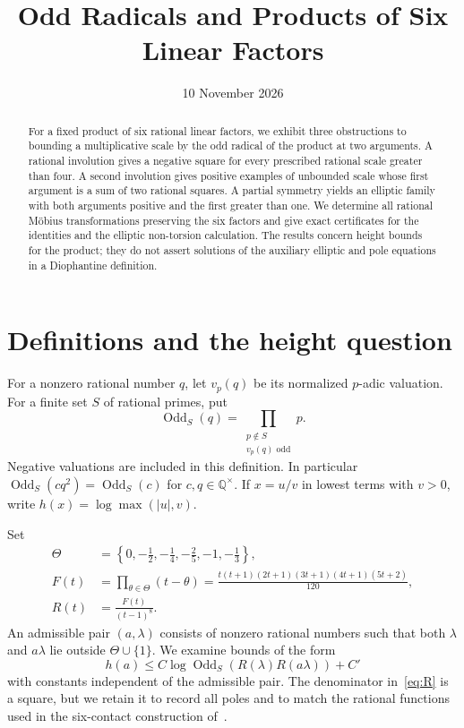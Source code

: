 \documentclass[11pt,a4paper]{article}
\title{Odd Radicals and Products of Six Linear Factors}
\author{}\date{10 November 2026}
\newcommand{\Q}{\mathbb Q}\newcommand{\Z}{\mathbb Z}
\DeclareMathOperator{\Odd}{Odd}
\begin{document}
\maketitle
\begin{abstract}
For a fixed product of six rational linear factors, we exhibit three
obstructions to bounding a multiplicative scale by the odd radical of
the product at two arguments. A rational involution gives a negative
square for every prescribed rational scale greater than four. A second
involution gives positive examples of unbounded scale whose first
argument is a sum of two rational squares. A partial symmetry yields
an elliptic family with both arguments positive and the first greater
than one. We determine all rational M\"obius transformations preserving
the six factors and give exact certificates for the identities and
the elliptic non-torsion calculation. The results concern height bounds
for the product; they do not assert solutions of the auxiliary elliptic
and pole equations in a Diophantine definition.
\end{abstract}

\section{Definitions and the height question}

For a nonzero rational number $q$, let $v_p(q)$ be its normalized
$p$-adic valuation. For a finite set $S$ of rational primes, put
\[
 \Odd_S(q)=\prod_{\substack{p\notin S\\v_p(q)\text{ odd}}}p.
\]
Negative valuations are included in this definition. In particular
$\Odd_S(cq^2)=\Odd_S(c)$ for $c,q\in\Q^\times$.
If $x=u/v$ in lowest terms with $v>0$, write
$h(x)=\log\max(|u|,v)$.

Set
\begin{align}
 \Theta&=\left\{0,-\frac12,-\frac14,-\frac25,-1,-\frac13\right\},
       \label{eq:contacts}\\
 F(t)&=\prod_{\theta\in\Theta}(t-\theta)
      =\frac{t(t+1)(2t+1)(3t+1)(4t+1)(5t+2)}{120},
       \label{eq:polynomial}\\
 R(t)&=\frac{F(t)}{(t-1)^8}.\label{eq:R}
\end{align}
An admissible pair $(a,\lambda)$ consists of nonzero rational numbers
such that both $\lambda$ and $a\lambda$ lie outside
$\Theta\cup\{1\}$. We examine bounds of the form
\begin{equation}\label{eq:height-question}
 h(a)\le C\log\Odd_S(R(\lambda)R(a\lambda))+C'
\end{equation}
with constants independent of the admissible pair. The denominator
in~\eqref{eq:R} is a square, but we retain it to record all poles
and to match the rational functions used in the six-contact
construction of~\cite{Conditional}.
\end{document}
